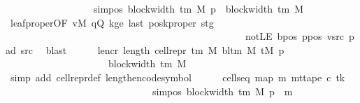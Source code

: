 \begin{isabellebody}
\ \ \ \ \ \ \ \ \ \ \ \ \ \ \ \ \ \ sim{\isacharunderscore}{\kern0pt}pos\ {\isacharparenleft}{\kern0pt}block{\isacharunderscore}{\kern0pt}width\ {\isacharparenleft}{\kern0pt}{\isasymGamma}{\isacharunderscore}{\kern0pt}tm\ M{\isacharparenright}{\kern0pt}{\isacharparenright}{\kern0pt}\ p\ {\isacharplus}{\kern0pt}\ block{\isacharunderscore}{\kern0pt}width\ {\isacharparenleft}{\kern0pt}{\isasymGamma}{\isacharunderscore}{\kern0pt}tm\ M{\isacharparenright}{\kern0pt}{\isacharparenright}{\kern0pt}{\isachardoublequoteclose}\isanewline
\ \ \ \ \ \ \isamarkupfalse%
\ leaf{\isacharunderscore}{\kern0pt}proper{\isacharbrackleft}{\kern0pt}OF\ vM\ qQ\ kge{}\ last\ posk{\isacharunderscore}{\kern0pt}proper\ stg\isanewline
\ \ \ \ \ \ \ \ \ \ \ \ \ \ \ \ \ \ \ \ \ \ \ \ \ \ \ \ \ \ \ \ \ \ \ \ \ \ \ \ \ \ \ \ \ \ \ \ \ notLE\ bpos\ ppos\ vsrc\ pad{}\ src{}{\isacharbrackright}{\kern0pt}\ \isamarkupfalse%
\ blast\isanewline
\ \ \ \ \isamarkupfalse%
\ len{\isacharunderscore}{\kern0pt}cr{\isacharcolon}{\kern0pt}\ {\isachardoublequoteopen}length\ {\isacharparenleft}{\kern0pt}cell{\isacharunderscore}{\kern0pt}repr\ {\isacharparenleft}{\kern0pt}{\isasymGamma}{\isacharunderscore}{\kern0pt}tm\ M{\isacharparenright}{\kern0pt}\ {\isacharparenleft}{\kern0pt}bl{\isacharunderscore}{\kern0pt}tm\ M{\isacharparenright}{\kern0pt}\ {\isacharparenleft}{\kern0pt}tM\ p{\isacharparenright}{\kern0pt}{\isacharparenright}{\kern0pt}\isanewline
\ \ \ \ \ \ \ \ \ \ \ \ \ \ \ \ \ \ \ \ {\isacharequal}{\kern0pt}\ block{\isacharunderscore}{\kern0pt}width\ {\isacharparenleft}{\kern0pt}{\isasymGamma}{\isacharunderscore}{\kern0pt}tm\ M{\isacharparenright}{\kern0pt}{\isachardoublequoteclose}\isanewline
\ \ \ \ \ \ \isamarkupfalse%
\ {\isacharparenleft}{\kern0pt}simp\ add{\isacharcolon}{\kern0pt}\ cell{\isacharunderscore}{\kern0pt}repr{\isacharunderscore}{\kern0pt}def\ length{\isacharunderscore}{\kern0pt}encode{\isacharunderscore}{\kern0pt}symbol{\isacharparenright}{\kern0pt}\isanewline
\ \ \ \ \isamarkupfalse%
\ cells{\isacharunderscore}{\kern0pt}eq{\isacharcolon}{\kern0pt}\ {\isachardoublequoteopen}map\ {\isacharparenleft}{\kern0pt}{\isasymlambda}m{\isachardot}{\kern0pt}\ mt{\isacharunderscore}{\kern0pt}tape\ c{\isacharprime}{\kern0pt}\ tk\isanewline
\ \ \ \ \ \ \ \ \ \ \ \ \ \ \ \ \ \ \ \ \ \ \ \ \ \ \ \ \ \ {\isacharparenleft}{\kern0pt}sim{\isacharunderscore}{\kern0pt}pos\ {\isacharparenleft}{\kern0pt}block{\isacharunderscore}{\kern0pt}width\ {\isacharparenleft}{\kern0pt}{\isasymGamma}{\isacharunderscore}{\kern0pt}tm\ M{\isacharparenright}{\kern0pt}{\isacharparenright}{\kern0pt}\ p\ {\isacharplus}{\kern0pt}\ m{\isacharparenright}{\kern0pt}{\isacharparenright}{\kern0pt}\isanewline

\end{isabellebody}
